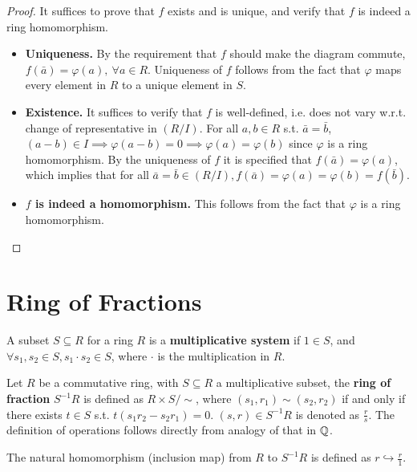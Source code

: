 \begin{proof}
    It suffices to prove that $f$ exists and is unique, and verify that $f$ is indeed a ring homomorphism.
    \begin{itemize}
        \item \textbf{Uniqueness.} By the requirement that $f$ should make the diagram commute, $f(\bar{a}) = \varphi(a),\ \forall a\in R$. Uniqueness of $f$ follows from the fact that $\varphi$ maps every element in $R$ to a unique element in $S$.
        \item \textbf{Existence.} It suffices to verify that $f$ is well-defined, i.e. does not vary w.r.t. change of representative in $(R/I)$. For all $a, b\in R$ s.t. $\bar{a} = \bar{b}$, $(a - b)\in I \implies \varphi(a - b) = 0 \implies \varphi(a) = \varphi(b)$ since $\varphi$ is a ring homomorphism. By the uniqueness of $f$ it is specified that $f(\bar{a}) = \varphi(a)$, which implies that for all $\bar{a} = \bar{b}\in (R/I), f(\bar{a}) = \varphi(a) = \varphi(b) = f(\bar{b})$.
        \item \textbf{$f$ is indeed a homomorphism.} This follows from the fact that $\varphi$ is a ring homomorphism.
    \end{itemize}
\end{proof}

\section{Ring of Fractions}

\begin{definition}
    A subset $S\subseteq R$ for a ring $R$ is a \textbf{multiplicative system} if $1\in S$, and $\forall s_1, s_2\in S, s_1\cdot s_2\in S$, where $\cdot$ is the multiplication in $R$.
\end{definition}

\begin{definition}
    Let $R$ be a commutative ring, with $S\subseteq R$ a multiplicative subset, the \textbf{ring of fraction} $S^{-1}R$ is defined as $R\times S / \sim$, where $(s_1, r_1) \sim (s_2, r_2)$ if and only if there exists $t\in S$ s.t. $t(s_1 r_2 - s_2 r_1) = 0$. $(s, r) \in S^{-1}R$ is denoted as $\frac{r}{s}$. The definition of operations follows directly from analogy of that in $\mathbb{Q}$.

    The natural homomorphism (inclusion map) from $R$ to $S^{-1}R$ is defined as $r \hookrightarrow \frac{r}{1}$.
\end{definition}

